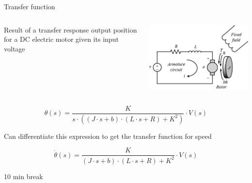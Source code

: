 \documentclass[compress]{beamer}
\makeatletter
\let\beamer@writeslidentry@miniframeson=\beamer@writeslidentry
\def\beamer@writeslidentry@miniframesoff{%
  \expandafter\beamer@ifempty\expandafter{\beamer@framestartpage}{}%
  {%
    \clearpage\beamer@notesactions%
  }
}
\newcommand*{\miniframeson}{\let\beamer@writeslidentry=\beamer@writeslidentry@miniframeson}
\newcommand*{\miniframesoff}{\let\beamer@writeslidentry=\beamer@writeslidentry@miniframesoff}
\makeatother
\begin{document}
\begin{frame}{Transfer function}

    \begin{columns}
        \begin{column}{0.5\linewidth}

            Result of a transfer response output position for a DC electric motor
            given its input voltage

        \end{column}
        \begin{column}{0.5\linewidth}


            \begin{center}
                \includegraphics[width=0.9\columnwidth]{image63}
            \end{center}

        \end{column}
    \end{columns}

\[
    \theta(s) = \frac{K}{s \cdot ( (J \cdot s + b) \cdot (L \cdot s+ R) + K^2)} \cdot V(s)
\]

\pause

Can differentiate this expression to get the transfer function for speed

\[
    \dot\theta(s) = \frac{K}{(J \cdot s + b) \cdot (L \cdot s + R) + K^2} \cdot V(s)
\]


\end{frame}

\miniframesoff
\begin{frame}[plain]
    \begin{center}
        \Large
        10 min break\\[2em]
    \end{center}
\end{frame}
\miniframeson
\end{document}
